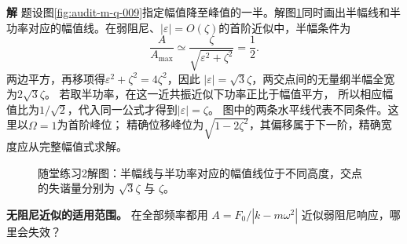 \documentclass[11pt,openany,fontset=fandol]{ctexbook}
\theoremstyle{plain}\newtheorem{theorem}{定理}[chapter]\newtheorem{proposition}[theorem]{命题}
\theoremstyle{definition}\newtheorem{definition}{定义}[chapter]\newtheorem{example}{例}[chapter]
\theoremstyle{remark}\newtheorem*{remark}{说明}
\newcommand{\SolutionStart}{\par\nobreak\medskip\nobreak\noindent\textbf{解}\quad\ignorespaces}
\newenvironment{solution}{\SolutionStart}{\par\medskip}
\begin{document}

\begin{solution}
题设图\ref{fig:audit-m-q-009}指定幅值降至峰值的一半。解图\ref{fig:class-1-2}同时画出半幅线和半功率对应的幅值线。在弱阻尼、$|\varepsilon|=O(\zeta)$的首阶近似中，半幅条件为
\[
 \frac{A}{A_{\max}}\simeq
 \frac{\zeta}{\sqrt{\varepsilon^2+\zeta^2}}=\frac12.
\]
两边平方，再移项得$\varepsilon^2+\zeta^2=4\zeta^2$，因此
$|\varepsilon|=\sqrt3\zeta$，两交点间的无量纲半幅全宽为$2\sqrt3\zeta$。
若取半功率，在这一近共振近似下功率正比于幅值平方，
所以相应幅值比为$1/\sqrt2$，代入同一公式才得到$|\varepsilon|=\zeta$。
图中的两条水平线代表不同条件。这里以$\Omega=1$为首阶峰位；
精确位移峰位为$\sqrt{1-2\zeta^2}$，其偏移属于下一阶，精确宽度应从完整幅值式求解。

\begin{figure}[H]\centering
{}
\caption{随堂练习2解图：半幅线与半功率对应的幅值线位于不同高度，交点的失谐量分别为 $\sqrt3\zeta$ 与 $\zeta$。}\label{fig:class-1-2}
\end{figure}
\end{solution}

\textbf{无阻尼近似的适用范围。} 在全部频率都用 $A=F_0/|k-m\omega^2|$ 近似弱阻尼响应，哪里会失效？
\end{document}
